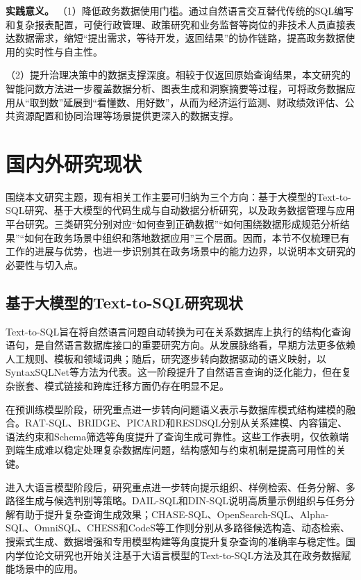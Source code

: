 \textbf{实践意义。}
（1）降低政务数据使用门槛。通过自然语言交互替代传统的SQL编写和复杂报表配置，可使行政管理、政策研究和业务监督等岗位的非技术人员直接表达数据需求，缩短“提出需求，等待开发，返回结果”的协作链路，提高政务数据使用的实时性与自主性。

（2）提升治理决策中的数据支撑深度。相较于仅返回原始查询结果，本文研究的智能问数方法进一步覆盖数据分析、图表生成和洞察摘要等过程，可将政务数据应用从“取到数”延展到“看懂数、用好数”，从而为经济运行监测、财政绩效评估、公共资源配置和协同治理等场景提供更深入的数据支撑。


\section{国内外研究现状}

围绕本文研究主题，现有相关工作主要可归纳为三个方向：基于大模型的Text-to-SQL研究、基于大模型的代码生成与自动数据分析研究，以及政务数据管理与应用平台研究。三类研究分别对应“如何查到正确数据”“如何围绕数据形成规范分析结果”“如何在政务场景中组织和落地数据应用”三个层面。因而，本节不仅梳理已有工作的进展与优势，也进一步识别其在政务场景中的能力边界，以说明本文研究的必要性与切入点。

\subsection{基于大模型的Text-to-SQL研究现状}

Text-to-SQL旨在将自然语言问题自动转换为可在关系数据库上执行的结构化查询语句，是自然语言数据库接口的重要研究方向\cite{liu2025survey}。从发展脉络看，早期方法更多依赖人工规则、模板和领域词典；随后，研究逐步转向数据驱动的语义映射，以SyntaxSQLNet等方法为代表\cite{yu2018syntaxsqlnet}。这一阶段提升了自然语言查询的泛化能力，但在复杂嵌套、模式链接和跨库迁移方面仍存在明显不足。

在预训练模型阶段，研究重点进一步转向问题语义表示与数据库模式结构建模的融合。RAT-SQL、BRIDGE、PICARD和RESDSQL分别从关系建模、内容锚定、语法约束和Schema筛选等角度提升了查询生成可靠性\cite{wang2020ratsql,lin2020bridge,scholak2021picard,li2023resdsql}。这些工作表明，仅依赖端到端生成难以稳定处理复杂数据库问题，结构感知与约束机制是提高可用性的关键。

进入大语言模型阶段后，研究重点进一步转向提示组织、样例检索、任务分解、多路径生成与候选判别等策略。DAIL-SQL和DIN-SQL说明高质量示例组织与任务分解有助于提升复杂查询生成效果\cite{gao2024text2sql,pourreza2023dinsql}；CHASE-SQL、OpenSearch-SQL、Alpha-SQL、OmniSQL、CHESS和CodeS等工作则分别从多路径候选构造、动态检索、搜索式生成、数据增强和专用模型构建等角度提升复杂查询的准确率与稳定性\cite{pourreza2024chase,xie2025opensearch,li2025alpha,li2025omnisql,talaei2024chess,li2024codes}。国内学位论文研究也开始关注基于大语言模型的Text-to-SQL方法及其在政务数据赋能场景中的应用\cite{申一凯2025,李竖飞2025,黄铠乘2025}。


